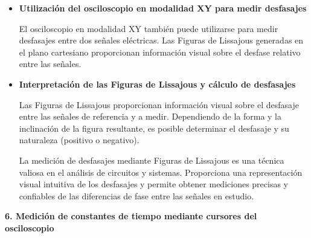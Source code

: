 \documentclass[12pt]{article}
\begin{document}
	\begin{itemize}
		\item \textbf{Utilización del osciloscopio en modalidad XY para medir desfasajes}
		
		El osciloscopio en modalidad XY también puede utilizarse para medir desfasajes entre dos señales eléctricas. Las Figuras de Lissajous generadas en el plano cartesiano proporcionan información visual sobre el desfase relativo entre las señales.
		
		\item \textbf{Interpretación de las Figuras de Lissajous y cálculo de desfasajes}
		
		Las Figuras de Lissajous proporcionan información visual sobre el desfasaje entre las señales de referencia y a medir. Dependiendo de la forma y la inclinación de la figura resultante, es posible determinar el desfasaje y su naturaleza (positivo o negativo).
		
		La medición de desfasajes mediante Figuras de Lissajous es una técnica valiosa en el análisis de circuitos y sistemas. Proporciona una representación visual intuitiva de los desfasajes y permite obtener mediciones precisas y confiables de las diferencias de fase entre las señales en estudio.
	\end{itemize}
	
	\textbf{6. Medición de constantes de tiempo mediante cursores del osciloscopio}
		
\end{document}
